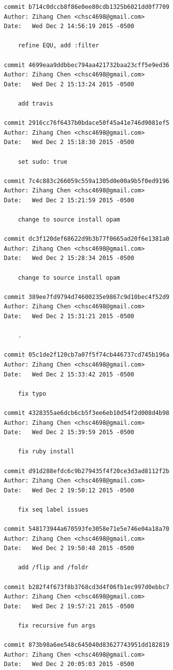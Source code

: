 \documentclass{report}
\begin{document}
\begin{appendices}
\begin{verbatim}
commit b714c0dccb8f86e0ee80cdb1325b6021dd0f7709
Author: Zihang Chen <chsc4698@gmail.com>
Date:   Wed Dec 2 14:56:19 2015 -0500

    refine EQU, add :filter

commit 4699eaa9ddbbec794aa421732baa23cff5e9ed36
Author: Zihang Chen <chsc4698@gmail.com>
Date:   Wed Dec 2 15:13:24 2015 -0500

    add travis

commit 2916cc76f6437b0bdace50f45a41e746d9081ef5
Author: Zihang Chen <chsc4698@gmail.com>
Date:   Wed Dec 2 15:18:30 2015 -0500

    set sudo: true

commit 7c4c883c266059c559a1305d0e00a9b5f0ed9196
Author: Zihang Chen <chsc4698@gmail.com>
Date:   Wed Dec 2 15:21:59 2015 -0500

    change to source install opam

commit dc3f120def68622d9b3b77f0665ad20f6e1381a0
Author: Zihang Chen <chsc4698@gmail.com>
Date:   Wed Dec 2 15:28:34 2015 -0500

    change to source install opam

commit 389ee7fd9794d74600235e9867c9d10bec4f52d9
Author: Zihang Chen <chsc4698@gmail.com>
Date:   Wed Dec 2 15:31:21 2015 -0500

    .

commit 05c1de2f120cb7a07f5f74cb446737cd745b196a
Author: Zihang Chen <chsc4698@gmail.com>
Date:   Wed Dec 2 15:33:42 2015 -0500

    fix typo

commit 4328355ae6dcb6cb5f3ee6eb10d54f2d008d4b98
Author: Zihang Chen <chsc4698@gmail.com>
Date:   Wed Dec 2 15:39:59 2015 -0500

    fix ruby install

commit d91d288efdc6c9b279435f4f20ce3d3ad8112f2b
Author: Zihang Chen <chsc4698@gmail.com>
Date:   Wed Dec 2 19:50:12 2015 -0500

    fix seq label issues

commit 548173944a670593fe3058e71e5e746e04a18a70
Author: Zihang Chen <chsc4698@gmail.com>
Date:   Wed Dec 2 19:50:48 2015 -0500

    add /flip and /foldr

commit b282f4f673f8b3768cd3d4f06fb1ec997d0ebbc7
Author: Zihang Chen <chsc4698@gmail.com>
Date:   Wed Dec 2 19:57:21 2015 -0500

    fix recursive fun args

commit 873b98a6ee548c645040d83627743951dd182819
Author: Zihang Chen <chsc4698@gmail.com>
Date:   Wed Dec 2 20:05:03 2015 -0500


\end{verbatim}
\end{appendices}
\end{document}
